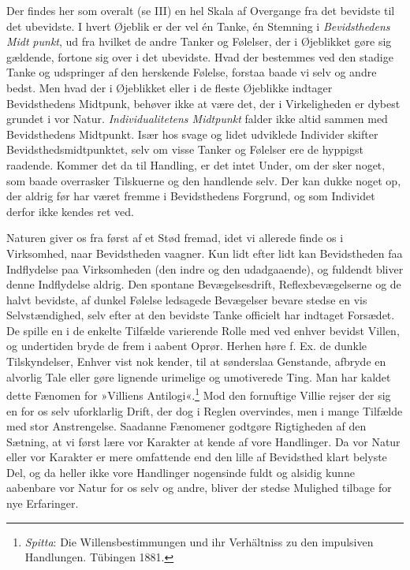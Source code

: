 \documentclass[12pt,a4paper,openany]{book}
\newcommand{\opage}[1]{\marginnote{\footnotesize\textit{[#1]}}}
\begin{document}
Der findes her som overalt (se III) en hel Skala af Overgange fra det
bevidste til det ubevidste. I hvert Øjeblik er der vel én Tanke, én
Stemning i \emph{Bevidsthedens Midt}%
\opage{398}\emph{punkt}, ud fra hvilket de andre Tanker og Følelser, der
i Øjeblikket gøre sig gældende, fortone sig over i det ubevidste. Hvad
der bestemmes ved den stadige Tanke og udspringer af den herskende
Følelse, forstaa baade vi selv og andre bedst. Men hvad der i Øjeblikket
eller i de fleste Øjeblikke indtager Bevidsthedens Midtpunk, behøver
ikke at være det, der i Virkeligheden er dybest grundet i vor Natur.
\emph{Individualitetens Midtpunkt} falder ikke altid sammen med
Bevidsthedens Midtpunkt. Især hos svage og lidet udviklede Individer
skifter Bevidsthedsmidtpunktet, selv om visse Tanker og Følelser ere de
hyppigst raadende. Kommer det da til Handling, er det intet Under, om
der sker noget, som baade overrasker Tilskuerne og den handlende selv.
Der kan dukke noget op, der aldrig før har været fremme i Bevidsthedens
Forgrund, og som Individet derfor ikke kendes ret ved.

Naturen giver os fra først af et Stød fremad, idet vi allerede finde os
i Virksomhed, naar Bevidstheden vaagner. Kun lidt efter lidt kan
Bevidstheden faa Indflydelse paa Virksomheden (den indre og den
udadgaaende), og fuldendt bliver denne Indflydelse aldrig. Den spontane
Bevægelsesdrift, Reflexbevægelserne og de halvt bevidste, af dunkel
Følelse ledsagede Bevægelser bevare stedse en vis Selvstændighed, selv
efter at den bevidste Tanke officielt har indtaget Forsædet. De spille
en i de enkelte Tilfælde varierende Rolle med ved enhver bevidst Villen,
og undertiden bryde de frem i aabent Oprør. Herhen høre f. Ex. de dunkle
Tilskyndelser, Enhver vist nok kender, til at sønderslaa Genstande,
afbryde en alvorlig Tale eller gøre lignende urimelige og umotiverede
Ting. Man har kaldet dette Fænomen for »Villiens
Antilogi«.\footnote[1]{\emph{Spitta}: Die Willensbestimmungen und ihr
Verhältniss zu den impulsiven Handlungen. Tübingen 1881.} Mod den
fornuftige Villie rejser der sig en for os selv uforklarlig Drift, der
dog i Reglen overvindes, men i mange Tilfælde med stor Anstrengelse.
Saadanne Fænomener godtgøre Rigtigheden af den Sætning, at vi først lære
vor Karakter at kende af vore Handlinger. Da vor Natur eller vor
Karakter er mere omfattende end den lille af Bevidsthed klart belyste
Del, og da heller ikke vore Handlinger nogensinde fuldt og
\opage{399}alsidig kunne aabenbare vor Natur for os selv og andre,
bliver der stedse Mulighed tilbage for nye Erfaringer.
\end{document}
